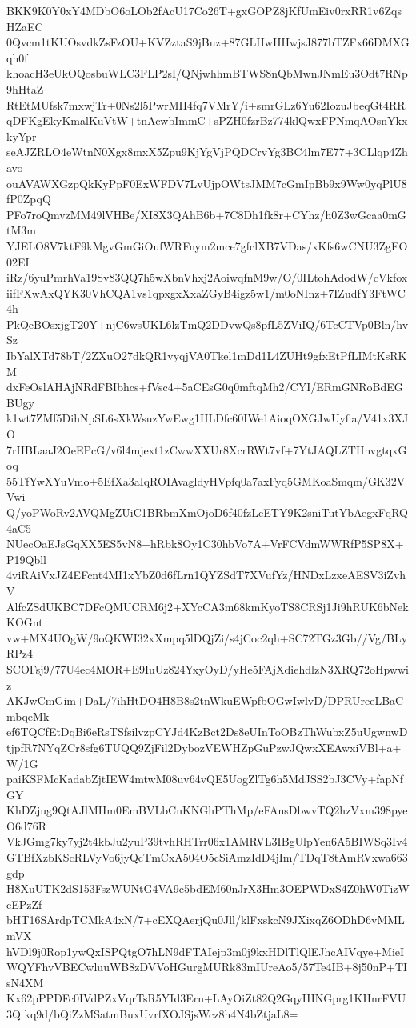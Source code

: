 BKK9K0Y0xY4MDbO6oLOb2fAcU17Co26T+gxGOPZ8jKfUmEiv0rxRR1v6ZqsHZaEC
0Qvcm1tKUOsvdkZsFzOU+KVZztaS9jBuz+87GLHwHHwjsJ877bTZFx66DMXGqh0f
khoacH3eUkOQosbuWLC3FLP2sI/QNjwhhmBTWS8nQbMwnJNmEu3Odt7RNp9hHtaZ
RtEtMUfsk7mxwjTr+0Ns2l5PwrMII4fq7VMrY/i+smrGLz6Yu62IozuJbeqGt4RR
qDFKgEkyKmalKuVtW+tnAcwbImmC+sPZH0fzrBz774klQwxFPNmqAOsnYkxkyYpr
seAJZRLO4eWtnN0Xgx8mxX5Zpu9KjYgVjPQDCrvYg3BC4lm7E77+3CLlqp4Zhavo
ouAVAWXGzpQkKyPpF0ExWFDV7LvUjpOWtsJMM7cGmIpBb9x9Ww0yqPlU8fP0ZpqQ
PFo7roQmvzMM49lVHBe/XI8X3QAhB6b+7C8Dh1fk8r+CYhz/h0Z3wGcaa0mGtM3m
YJELO8V7ktF9kMgvGmGiOufWRFnym2mce7gfclXB7VDas/xKfs6wCNU3ZgEO02EI
iRz/6yuPmrhVa19Sv83QQ7h5wXbnVhxj2AoiwqfnM9w/O/0ILtohAdodW/cVkfox
iifFXwAxQYK30VhCQA1vs1qpxgxXxaZGyB4igz5w1/m0oNInz+7IZudfY3FtWC4h
PkQcBOsxjgT20Y+njC6wsUKL6lzTmQ2DDvwQs8pfL5ZViIQ/6TcCTVp0Bln/hvSz
IbYalXTd78bT/2ZXuO27dkQR1vyqjVA0Tkel1mDd1L4ZUHt9gfxEtPfLIMtKsRKM
dxFeOslAHAjNRdFBIbhcs+fVsc4+5aCEsG0q0mftqMh2/CYI/ERmGNRoBdEGBUgy
k1wt7ZMf5DihNpSL6sXkWsuzYwEwg1HLDfc60IWe1AioqOXGJwUyfia/V41x3XJO
7rHBLaaJ2OeEPcG/v6l4mjext1zCwwXXUr8XcrRWt7vf+7YtJAQLZTHnvgtqxGoq
55TfYwXYuVmo+5EfXa3aIqROIAvagldyHVpfq0a7axFyq5GMKoaSmqm/GK32VVwi
Q/yoPWoRv2AVQMgZUiC1BRbmXmOjoD6f40fzLcETY9K2sniTutYbAegxFqRQ4aC5
NUecOaEJsGqXX5ES5vN8+hRbk8Oy1C30hbVo7A+VrFCVdmWWRfP5SP8X+P19Qbll
4viRAiVxJZ4EFcnt4MI1xYbZ0d6fLrn1QYZSdT7XVufYz/HNDxLzxeAESV3iZvhV
AlfcZSdUKBC7DFcQMUCRM6j2+XYcCA3m68kmKyoTS8CRSj1Ji9hRUK6bNekKOGnt
vw+MX4UOgW/9oQKWI32xXmpq5lDQjZi/s4jCoc2qh+SC72TGz3Gb//Vg/BLyRPz4
SCOFsj9/77U4ec4MOR+E9IuUz824YxyOyD/yHe5FAjXdiehdlzN3XRQ72oHpwwiz
AKJwCmGim+DaL/7ihHtDO4H8B8s2tnWkuEWpfbOGwIwlvD/DPRUreeLBaCmbqeMk
ef6TQCfEtDqBi6eRsTSfsilvzpCYJd4KzBct2Ds8eUInToOBzThWubxZ5uUgwnwD
tjpfR7NYqZCr8sfg6TUQQ9ZjFil2DybozVEWHZpGuPzwJQwxXEAwxiVBl+a+W/1G
paiKSFMcKadabZjtIEW4mtwM08uv64vQE5UogZlTg6h5MdJSS2bJ3CVy+fapNfGY
KhDZjug9QtAJlMHm0EmBVLbCnKNGhPThMp/eFAnsDbwvTQ2hzVxm398pyeO6d76R
VkJGmg7ky7yj2t4kbJu2yuP39tvhRHTrr06x1AMRVL3IBgUlpYen6A5BIWSq3Iv4
GTBfXzbKScRLVyVo6jyQcTmCxA504O5cSiAmzIdD4jIm/TDqT8tAmRVxwa663gdp
H8XuUTK2dS153FszWUNtG4VA9c5bdEM60nJrX3Hm3OEPWDxS4Z0hW0TizWcEPzZf
bHT16SArdpTCMkA4xN/7+cEXQAerjQu0Jll/klFxskcN9JXixqZ6ODhD6vMMLmVX
hVDl9j0Rop1ywQxISPQtgO7hLN9dFTAIejp3m0j9kxHDlTlQlEJhcAIVqye+MieI
WQYFhvVBECwluuWB8zDVVoHGurgMURk83mIUreAo5/57Te4IB+8j50nP+TIsN4XM
Kx62pPPDFc0IVdPZxVqrTsR5YId3Ern+LAyOiZt82Q2GqyIIINGprg1KHnrFVU3Q
kq9d/bQiZzMSatmBuxUvrfXOJSjsWcz8h4N4bZtjaL8=
